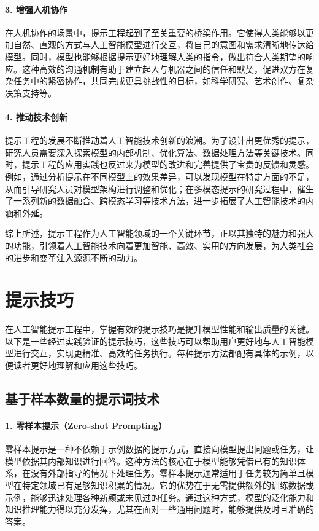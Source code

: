 \paragraph{3. 增强人机协作} 

在人机协作的场景中，提示工程起到了至关重要的桥梁作用。它使得人类能够以更加自然、直观的方式与人工智能模型进行交互，将自己的意图和需求清晰地传达给模型。同时，模型也能够根据提示更好地理解人类的指令，做出符合人类期望的响应。这种高效的沟通机制有助于建立起人与机器之间的信任和默契，促进双方在复杂任务中的紧密协作，共同完成更具挑战性的目标，如科学研究、艺术创作、复杂决策支持等。

\paragraph{4. 推动技术创新} 

提示工程的发展不断推动着人工智能技术创新的浪潮。为了设计出更优秀的提示，研究人员需要深入探索模型的内部机制、优化算法、数据处理方法等关键技术。同时，提示工程的应用实践也反过来为模型的改进和完善提供了宝贵的反馈和灵感。例如，通过分析提示在不同模型上的效果差异，可以发现模型在特定方面的不足，从而引导研究人员对模型架构进行调整和优化；在多模态提示的研究过程中，催生了一系列新的数据融合、跨模态学习等技术方法，进一步拓展了人工智能技术的内涵和外延。

综上所述，提示工程作为人工智能领域的一个关键环节，正以其独特的魅力和强大的功能，引领着人工智能技术向着更加智能、高效、实用的方向发展，为人类社会的进步和变革注入源源不断的动力。

\section{提示技巧}

在人工智能提示工程中，掌握有效的提示技巧是提升模型性能和输出质量的关键。以下是一些经过实践验证的提示技巧，这些技巧可以帮助用户更好地与人工智能模型进行交互，实现更精准、高效的任务执行。每种提示方法都配有具体的示例，以便读者更好地理解和应用这些技巧。

\subsection{基于样本数量的提示词技术}

\paragraph{1. 零样本提示（Zero-shot Prompting）} 

零样本提示是一种不依赖于示例数据的提示方式，直接向模型提出问题或任务，让模型依据其内部知识进行回答。这种方法的核心在于模型能够凭借已有的知识体系，在没有外部指导的情况下处理任务。零样本提示通常适用于任务较为简单且模型在特定领域已有足够知识积累的情况。它的优势在于无需提供额外的训练数据或示例，能够迅速处理各种新颖或未见过的任务。通过这种方式，模型的泛化能力和知识推理能力得以充分发挥，尤其在面对一些通用问题时，能够提供及时且准确的答案。

